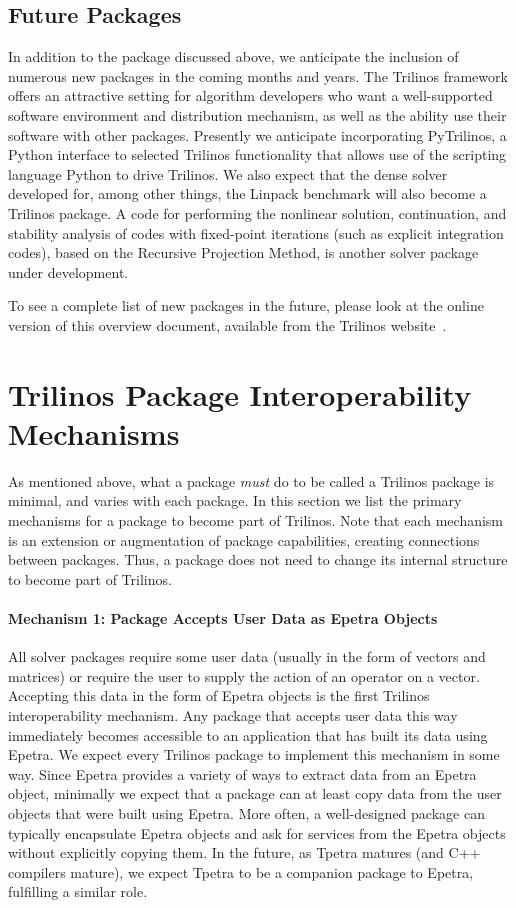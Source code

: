 \documentclass[acmtoms,acmnow]{acmtrans2m}
\begin{document}
\subsection{Future Packages}

In addition to the package discussed above, we anticipate the
inclusion of numerous new packages in the coming months and years.
The Trilinos framework offers an attractive setting for algorithm
developers who want a well-supported software environment and
distribution mechanism, as well as the ability use their software with
other packages.  Presently we anticipate incorporating PyTrilinos, a
Python interface to selected Trilinos functionality that allows use of
the scripting language Python to drive Trilinos.  We also expect that
the dense solver developed for, among other things, the Linpack
benchmark will also become a Trilinos package. A code for
performing the nonlinear solution, continuation, and stability 
analysis of codes with fixed-point iterations (such as explicit
integration codes), based on the Recursive Projection Method, is
another solver package under development.

To see a complete list of new packages in the future, please look at
the online version of this overview document, available from the
Trilinos website~\cite{Trilinos-home-page}.

\section{Trilinos Package Interoperability Mechanisms}
\label{sect:PackageDefinition}
As mentioned above, what a package {\it must} do to be called a Trilinos
package is minimal, and varies with each package.  In this section we
list the primary mechanisms for a package to become part of Trilinos.
Note that each mechanism is an extension or augmentation of package
capabilities, creating connections between packages.  Thus, a package does 
not need to change its internal structure to become part of Trilinos.

\paragraph*{Mechanism 1: Package Accepts User Data as Epetra Objects}
All solver packages require some user data (usually in the form of
vectors and matrices) or require the user to supply the action of an
operator on a vector.  Accepting this data in the form of Epetra
objects is the first Trilinos interoperability mechanism.  Any package
that accepts user data this way immediately becomes accessible to an
application that has built its data using Epetra.  We expect every
Trilinos package to implement this mechanism in some way.  Since
Epetra provides a variety of ways to extract data from an Epetra
object, minimally we expect that a package can at least copy data from
the user objects that were built using Epetra.  More often, a well-designed
package can typically encapsulate Epetra objects and ask for services from
the Epetra objects without explicitly copying them.  In the future, as
Tpetra matures (and C++ compilers mature), we expect Tpetra to be a
companion package to Epetra, fulfilling a similar role.
\end{document}
